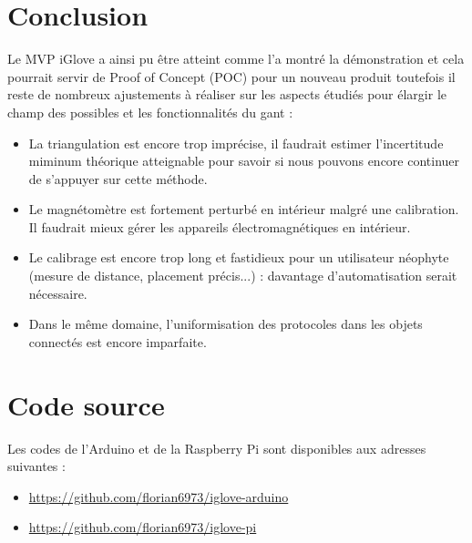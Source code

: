 \documentclass{article}
\begin{document}
    \section{Conclusion}

            Le MVP iGlove a ainsi pu être atteint comme l'a montré la démonstration et cela pourrait servir de Proof of Concept (POC) pour un nouveau produit
             toutefois il reste de nombreux ajustements à réaliser sur les aspects étudiés pour élargir le champ des possibles et les fonctionnalités du gant :
             \begin{itemize}
                \item La triangulation est encore trop imprécise, il faudrait estimer l'incertitude miminum théorique atteignable 
                        pour savoir si nous pouvons encore continuer de s'appuyer sur cette méthode.
                \item Le magnétomètre est fortement perturbé en intérieur malgré une calibration.
                        Il faudrait mieux gérer les appareils électromagnétiques en intérieur.
                \item Le calibrage est encore trop long et fastidieux pour un utilisateur néophyte (mesure de distance, placement précis...) :
                        davantage d'automatisation serait nécessaire.
                \item Dans le même domaine, l'uniformisation des protocoles dans les objets connectés est encore imparfaite.
             \end{itemize}


    \appendix

    \section {Code source}
        Les codes de l'Arduino et de la Raspberry Pi sont disponibles aux adresses suivantes :
        \begin{itemize}
            \item \url{https://github.com/florian6973/iglove-arduino}
            \item \url{https://github.com/florian6973/iglove-pi}
        \end{itemize}
\end{document}
